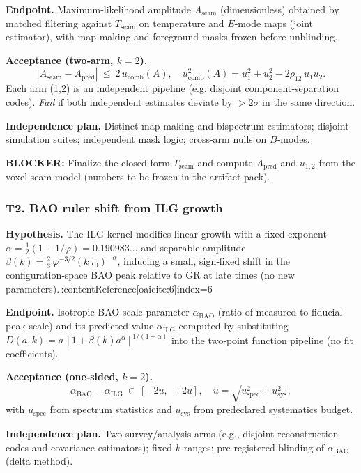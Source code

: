 \documentclass[11pt]{article}
\begin{document}
\textbf{Endpoint.} Maximum‑likelihood amplitude $A_{\mathrm{seam}}$ (dimensionless) obtained by matched filtering against $T_{\mathrm{seam}}$ on temperature and $E$‑mode maps (joint estimator), with map‑making and foreground masks frozen before unblinding.

\textbf{Acceptance (two‑arm, $k=2$).}
\[
|A_{\mathrm{seam}}-A_{\mathrm{pred}}|\ \le\ 2\,u_{\mathrm{comb}}(A),
\quad
u_{\mathrm{comb}}^{2}(A)=u_{1}^{2}+u_{2}^{2}-2\rho_{12}\,u_{1}u_{2}.
\]
Each arm (1,2) is an independent pipeline (e.g. disjoint component‑separation codes). \emph{Fail} if both independent estimates deviate by $>2\sigma$ in the same direction.

\textbf{Independence plan.} Distinct map‑making and bispectrum estimators; disjoint simulation suites; independent mask logic; cross‑arm nulls on $B$‑modes.

\textbf{BLOCKER:} Finalize the closed‑form $T_{\mathrm{seam}}$ and compute $A_{\mathrm{pred}}$ and $u_{1,2}$ from the voxel‑seam model (numbers to be frozen in the artifact pack).

\subsubsection*{T2. BAO ruler shift from ILG growth}
\textbf{Hypothesis.} The ILG kernel modifies linear growth with a fixed exponent
$\alpha=\tfrac12(1-1/\varphi)=0.190983\ldots$ and separable amplitude
$\beta(k)=\tfrac23\,\varphi^{-3/2}(k\,\tau_{0})^{-\alpha}$, inducing a small, sign‑fixed shift in the configuration‑space BAO peak relative to GR at late times (no new parameters).\,:contentReference[oaicite:6]{index=6}

\textbf{Endpoint.} Isotropic BAO scale parameter $\alpha_{\mathrm{BAO}}$ (ratio of measured to fiducial peak scale) and its predicted value $\alpha_{\mathrm{ILG}}$ computed by substituting $D(a,k)=a\,[1+\beta(k)a^{\alpha}]^{1/(1+\alpha)}$ into the two‑point function pipeline (no fit coefficients).

\textbf{Acceptance (one‑sided, $k=2$).}
\[
\alpha_{\mathrm{BAO}}-\alpha_{\mathrm{ILG}}\ \in\ [-2u,\, +2u],
\quad
u=\sqrt{u_{\mathrm{spec}}^{2}+u_{\mathrm{sys}}^{2}},
\]
with $u_{\mathrm{spec}}$ from spectrum statistics and $u_{\mathrm{sys}}$ from predeclared systematics budget.

\textbf{Independence plan.} Two survey/analysis arms (e.g., disjoint reconstruction codes and covariance estimators); fixed $k$‑ranges; pre‑registered blinding of $\alpha_{\mathrm{BAO}}$ (delta method).
\end{document}
